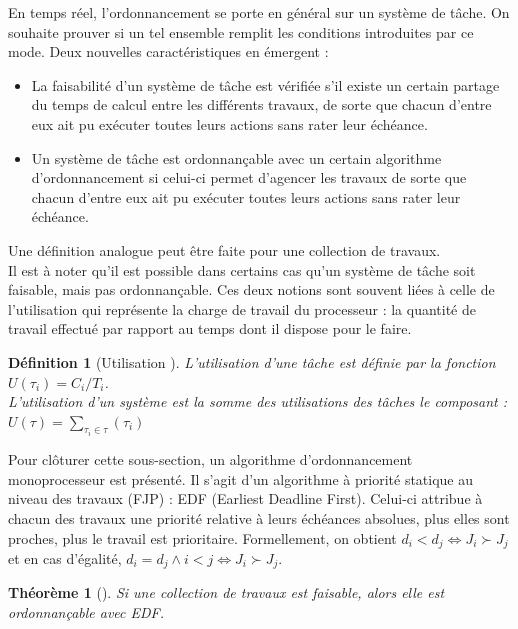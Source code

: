 \documentclass[11pt,a4paper,oneside]{book}
\theoremstyle{break}
\newtheorem{defin}{Définition}
\theoremstyle{breakplain}
\newtheorem{theo}{Théorème}
\begin{document}
En temps réel, l'ordonnancement se porte en général sur un système de tâche. On souhaite prouver si un tel ensemble remplit les conditions introduites par ce mode. Deux nouvelles caractéristiques en émergent \cite{goossens2014os} :

\begin{itemize}
\item La faisabilité d'un système de tâche est vérifiée s'il existe un certain partage du temps de calcul entre les différents travaux, de sorte que chacun d'entre eux ait pu exécuter toutes leurs actions sans rater leur échéance.
\item Un système de tâche est ordonnançable avec un certain algorithme d'ordonnancement si celui-ci permet d'agencer les travaux de sorte que chacun d'entre eux ait pu exécuter toutes leurs actions sans rater leur échéance.\\
\end{itemize}

Une définition analogue peut être faite pour une collection de travaux.\\

Il est à noter qu'il est possible dans certains cas qu'un système de tâche soit faisable, mais pas ordonnançable. Ces deux notions sont souvent liées à celle de l'utilisation qui représente la charge de travail du processeur : la quantité de travail effectué par rapport au temps dont il dispose pour le faire.

\begin{defin}[Utilisation \cite{goossens2014os}]
L'utilisation d'une tâche est définie par la fonction $U(\tau_i) = C_i/T_i$.\\
L'utilisation d'un système est la somme des utilisations des tâches le composant : $U(\tau) = \underset{\tau_i \in \tau}{\sum} (\tau_i)$
\end{defin}

Pour clôturer cette sous-section, un algorithme d'ordonnancement monoprocesseur est présenté. Il s'agit d'un algorithme à priorité statique au niveau des travaux (FJP) : EDF (Earliest Deadline First). Celui-ci attribue à chacun des travaux une priorité relative à leurs échéances absolues, plus elles sont proches, plus le travail est prioritaire. Formellement, on obtient $d_i < d_j \Leftrightarrow J_i \succ J_j$ et en cas d'égalité, $d_i = d_j \wedge i < j \Leftrightarrow J_i \succ J_j$.

\begin{theo}[\cite{goossens2014os}]
Si une collection de travaux est faisable, alors elle est ordonnançable avec EDF.
\end{theo}
\end{document}
